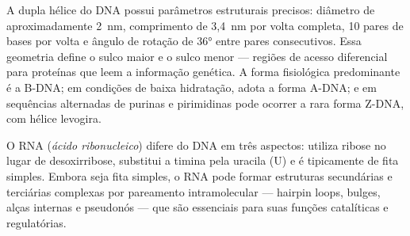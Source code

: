 A dupla hélice do DNA possui parâmetros estruturais precisos: diâmetro de aproximadamente
2~nm, comprimento de 3,4~nm por volta completa, 10 pares de bases por volta e ângulo de
rotação de 36° entre pares consecutivos. Essa geometria define o sulco maior e o sulco menor
--- regiões de acesso diferencial para proteínas que leem a informação genética. A forma
fisiológica predominante é a B-DNA; em condições de baixa hidratação, adota a forma A-DNA;
e em sequências alternadas de purinas e pirimidinas pode ocorrer a rara forma Z-DNA, com
hélice levogira.

O RNA (\emph{ácido ribonucleico}) difere do DNA em três aspectos: utiliza ribose no lugar
de desoxirribose, substitui a timina pela uracila (U) e é tipicamente de fita simples.
Embora seja fita simples, o RNA pode formar estruturas secundárias e terciárias complexas
por pareamento intramolecular --- hairpin loops, bulges, alças internas e pseudonós ---
que são essenciais para suas funções catalíticas e regulatórias.

